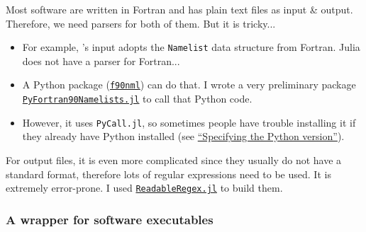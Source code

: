 \begin{frame}[allowframebreaks]{\subsubsecname}
    Most \ab{} software are written in Fortran and has plain text files as input \& output.
    Therefore, we need parsers for both of them. But it is tricky...

        {\footnotesize
            \begin{itemize}
                \item For example, \qe{}'s input adopts the \texttt{Namelist} data structure from
                      Fortran. Julia does not have a parser for Fortran...
                \item A Python package
                      (\href{https://github.com/marshallward/f90nml}{\texttt{f90nml}}) can do that.
                      I wrote a very preliminary package
                      \href{https://github.com/singularitti/PyFortran90Namelists.jl}{\texttt{PyFortran90Namelists.jl}}
                      to call that Python code.
                \item However, it uses \texttt{PyCall.jl}, so sometimes people have trouble installing
                      it if they already have Python installed
                      (see \href{https://github.com/JuliaPy/PyCall.jl\#specifying-the-python-version}{``Specifying the Python version''}).
            \end{itemize}
        }

    For output files, it is even more complicated since they usually do not have a standard
    format, therefore lots of regular expressions need to be used.
    It is extremely error-prone. I used
    \href{https://github.com/jkrumbiegel/ReadableRegex.jl}{\texttt{ReadableRegex.jl}} to build them.


\end{frame}

\subsubsection{A wrapper for \ab{} software executables}

